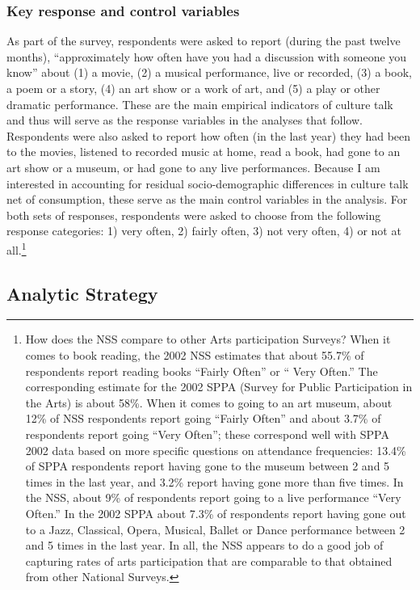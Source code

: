 \subsubsection{Key response and control variables}
As part of the survey, respondents were asked to report (during the past twelve months), ``approximately how often have you had a discussion with someone you know'' about (1) a movie, (2) a musical performance, live or recorded, (3) a book, a poem or a story, (4) an art show or a work of art, and (5) a play or other dramatic performance.  These are the main empirical indicators of culture talk and thus will serve as the response variables in the analyses that follow.  Respondents were also asked to report how often (in the last year) they had been to the movies, listened to recorded music at home, read a book, had gone to an art show or a museum, or had gone to any live performances.  Because I am interested in accounting for residual socio-demographic differences in culture talk net of consumption, these serve as the main control variables in the analysis.  For both sets of responses, respondents were asked to choose from the following response categories: 1) very often, 2) fairly often, 3) not very often, 4) or not at all.\footnote{How does the NSS compare to other Arts participation Surveys?  When it comes to book reading, the 2002 NSS estimates that about 55.7\% of respondents report reading books ``Fairly Often'' or `` Very Often.''  The corresponding estimate for the 2002 SPPA (Survey for Public Participation in the Arts) is about 58\%.  When it comes to going to an art museum, about 12\% of NSS respondents report going ``Fairly Often'' and about 3.7\% of respondents report going ``Very Often''; these correspond well with SPPA 2002 data based on more specific questions on attendance frequencies:  13.4\% of SPPA respondents report having gone to the museum between 2 and 5 times in the last year, and 3.2\% report having gone more than five times.  In the NSS, about 9\% of respondents report going to a live performance ``Very Often.''  In the 2002 SPPA about 7.3\% of respondents report having gone out to a Jazz, Classical, Opera, Musical, Ballet or Dance performance between 2 and 5 times in the last year.  In all, the NSS appears to do a good job of capturing rates of arts participation that are comparable to that obtained from other National Surveys.}
 
\subsection{Analytic Strategy}
